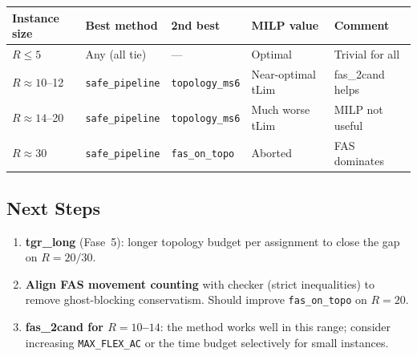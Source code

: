 \begin{center}
\begin{tabular}{lllll}
\toprule
Instance size & Best method & 2nd best & MILP value & Comment \\
\midrule
$R \leq 5$   & Any (all tie) & — & Optimal & Trivial for all \\
$R \approx 10$--12 & \texttt{safe\_pipeline} & \texttt{topology\_ms6} & Near-optimal tLim & fas\_2cand helps \\
$R \approx 14$--20 & \texttt{safe\_pipeline} & \texttt{topology\_ms6} & Much worse tLim & MILP not useful \\
$R \approx 30$ & \texttt{safe\_pipeline} & \texttt{fas\_on\_topo} & Aborted & FAS dominates \\
\bottomrule
\end{tabular}
\end{center}

\subsection{Next Steps}
\label{exp:exp06-next}

\begin{enumerate}[noitemsep]
    \item \textbf{tgr\_long} (Fase~5): longer topology budget per assignment
          to close the gap on $R=20/30$.
    \item \textbf{Align FAS movement counting} with checker (strict inequalities)
          to remove ghost-blocking conservatism.  Should improve
          \texttt{fas\_on\_topo} on $R=20$.
    \item \textbf{fas\_2cand for $R=10$--$14$}: the method works well in this
          range; consider increasing \texttt{MAX\_FLEX\_AC} or the time budget
          selectively for small instances.
\end{enumerate}
